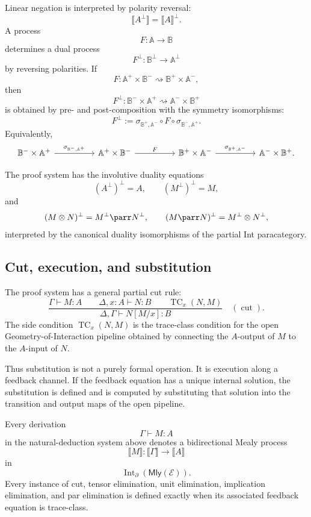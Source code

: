 Linear negation is interpreted by polarity reversal:
\[
\llbracket A^\bot\rrbracket=\llbracket A\rrbracket^\bot.
\]
A process
\[
F:\mathbb A\to\mathbb B
\]
determines a dual process
\[
F^\bot:\mathbb B^\bot\to\mathbb A^\bot
\]
by reversing polarities.  If
\[
F:
\mathbb A^+\times\mathbb B^-
\rightsquigarrow
\mathbb B^+\times\mathbb A^-,
\]
then
\[
F^\bot:
\mathbb B^-\times\mathbb A^+
\rightsquigarrow
\mathbb A^-\times\mathbb B^+
\]
is obtained by pre- and post-composition with the symmetry isomorphisms:
\[
F^\bot
:=
\sigma_{\mathbb B^+,\mathbb A^-}
\circ
F
\circ
\sigma_{\mathbb B^-,\mathbb A^+}.
\]
Equivalently,
\[
\begin{tikzcd}[column sep=huge,row sep=large]
\mathbb B^-\times\mathbb A^+
  \arrow[r, "\sigma_{\mathbb B^-,\mathbb A^+}"]
&
\mathbb A^+\times\mathbb B^-
  \arrow[r, "F"]
&
\mathbb B^+\times\mathbb A^-
  \arrow[r, "\sigma_{\mathbb B^+,\mathbb A^-}"]
&
\mathbb A^-\times\mathbb B^+ .
\end{tikzcd}
\]

The proof system has the involutive duality equations
\[
(A^\bot)^\bot=A,
\qquad
(M^\bot)^\bot=M,
\]
and
\[
(M\otimes N)^\bot=M^\bot\parr N^\bot,
\qquad
(M\parr N)^\bot=M^\bot\otimes N^\bot,
\]
interpreted by the canonical duality isomorphisms of the partial Int
paracategory.

\subsection{Cut, execution, and substitution}

The proof system has a general partial cut rule:
\[
\frac{
  \Gamma\vdash M:A
  \qquad
  \Delta,x:A\vdash N:B
  \qquad
  \operatorname{TC}_x(N,M)
}{
  \Delta,\Gamma\vdash N[M/x]:B
}
\quad(\operatorname{cut}).
\]
The side condition \(\operatorname{TC}_x(N,M)\) is the trace-class condition
for the open Geometry-of-Interaction pipeline obtained by connecting the
\(A\)-output of \(M\) to the \(A\)-input of \(N\).

Thus substitution is not a purely formal operation.  It is execution along a
feedback channel.  If the feedback equation has a unique internal solution,
the substitution is defined and is computed by substituting that solution into
the transition and output maps of the open pipeline.

\begin{theorem}
\label{thm:pml-soundness}
Every derivation
\[
\Gamma\vdash M:A
\]
in the natural-deduction system above denotes a bidirectional Mealy process
\[
\llbracket M\rrbracket:
\llbracket\Gamma\rrbracket
\to
\llbracket A\rrbracket
\]
in
\[
\operatorname{Int}_{\partial}(\mathsf{Mly}(\mathcal E)).
\]
Every instance of cut, tensor elimination, unit elimination, implication
elimination, and par elimination is defined exactly when its associated
feedback equation is trace-class.
\end{theorem}

